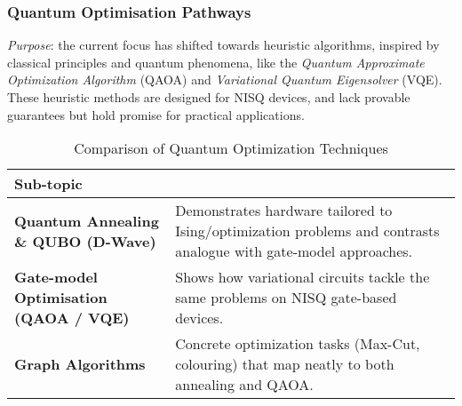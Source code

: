 \subsubsection{Quantum Optimisation Pathways}

\emph{Purpose}: the current focus has shifted towards heuristic algorithms, inspired by classical principles and quantum phenomena, 
like the \emph{Quantum Approximate Optimization Algorithm} (QAOA) and \emph{Variational Quantum Eigensolver} (VQE).
These heuristic methods are designed for NISQ devices, and lack provable guarantees but hold promise for practical applications.
 
\begin{table}[ht]
	\centering
	\begin{tabular}{|p{4cm}p{10.25cm}|}
		\hline
		\textbf{Sub-topic} & \textbf{} \\
		\hline
		\textbf{Quantum Annealing \& QUBO (D-Wave)} & Demonstrates hardware tailored to Ising/optimization problems and contrasts analogue with gate-model approaches. \\
		\hline
		\textbf{Gate-model Optimisation (QAOA / VQE)} & Shows how variational circuits tackle the same problems on NISQ gate-based devices. \\
		\hline
		\textbf{Graph Algorithms} & Concrete optimization tasks (Max-Cut, colouring) that map neatly to both annealing and QAOA. \\
		\hline
	\end{tabular}
	\caption{Comparison of Quantum Optimization Techniques}
\end{table}






